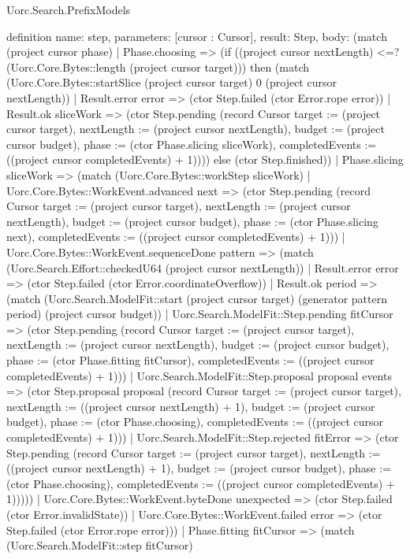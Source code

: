 \begin{lexlean}{Uorc.Search.PrefixModels}
\begin{semanticmodule}
definition{
  name: step,
  parameters: [cursor : Cursor],
  result: Step,
  body: (match (project cursor phase)
    | Phase.choosing => (if ((project cursor nextLength) <=? (Uorc.Core.Bytes::length (project cursor target))) then (match (Uorc.Core.Bytes::startSlice (project cursor target) 0 (project cursor nextLength))
      | Result.error error => (ctor Step.failed (ctor Error.rope error))
      | Result.ok sliceWork => (ctor Step.pending (record Cursor {target := (project cursor target), nextLength := (project cursor nextLength), budget := (project cursor budget), phase := (ctor Phase.slicing sliceWork), completedEvents := ((project cursor completedEvents) + 1)}))) else (ctor Step.finished))
    | Phase.slicing sliceWork => (match (Uorc.Core.Bytes::workStep sliceWork)
      | Uorc.Core.Bytes::WorkEvent.advanced next => (ctor Step.pending (record Cursor {target := (project cursor target), nextLength := (project cursor nextLength), budget := (project cursor budget), phase := (ctor Phase.slicing next), completedEvents := ((project cursor completedEvents) + 1)}))
      | Uorc.Core.Bytes::WorkEvent.sequenceDone pattern => (match (Uorc.Search.Effort::checkedU64 (project cursor nextLength))
        | Result.error error => (ctor Step.failed (ctor Error.coordinateOverflow))
        | Result.ok period => (match (Uorc.Search.ModelFit::start (project cursor target) (generator pattern period) (project cursor budget))
          | Uorc.Search.ModelFit::Step.pending fitCursor => (ctor Step.pending (record Cursor {target := (project cursor target), nextLength := (project cursor nextLength), budget := (project cursor budget), phase := (ctor Phase.fitting fitCursor), completedEvents := ((project cursor completedEvents) + 1)}))
          | Uorc.Search.ModelFit::Step.proposal proposal events => (ctor Step.proposal proposal (record Cursor {target := (project cursor target), nextLength := ((project cursor nextLength) + 1), budget := (project cursor budget), phase := (ctor Phase.choosing), completedEvents := ((project cursor completedEvents) + 1)}))
          | Uorc.Search.ModelFit::Step.rejected fitError => (ctor Step.pending (record Cursor {target := (project cursor target), nextLength := ((project cursor nextLength) + 1), budget := (project cursor budget), phase := (ctor Phase.choosing), completedEvents := ((project cursor completedEvents) + 1)}))))
      | Uorc.Core.Bytes::WorkEvent.byteDone unexpected => (ctor Step.failed (ctor Error.invalidState))
      | Uorc.Core.Bytes::WorkEvent.failed error => (ctor Step.failed (ctor Error.rope error)))
    | Phase.fitting fitCursor => (match (Uorc.Search.ModelFit::step fitCursor)
}
\end{semanticmodule}
\end{lexlean}
